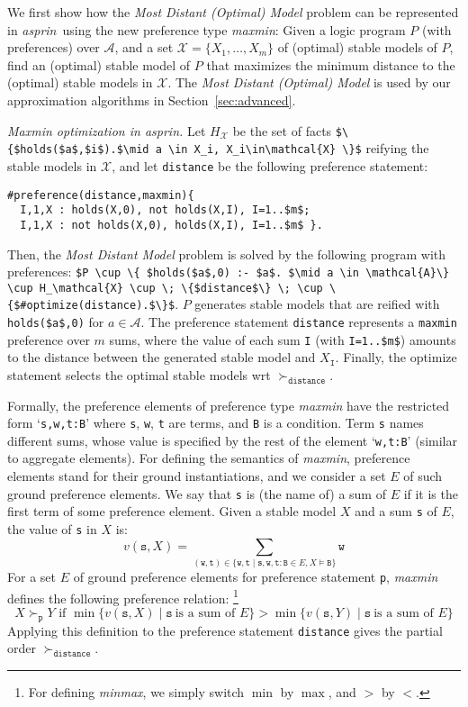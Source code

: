 \documentclass[a4paper,USenglish]{oasics-v2016}
\newcommand{\lm}[1]{\lstinline[mathescape=true]!#1!}
\newcommand{\sysfont}{\textit}
\newcommand{\asprin}{\sysfont{asprin}}
\begin{document}
We first show how the \emph{Most Distant (Optimal) Model} problem can be represented in \asprin\ 
using the new preference type \textit{maxmin}: %
Given a logic program $P$ (with preferences) over $\mathcal{A}$, 
and a set $\mathcal{X}=\{ X_1, \ldots, X_m \}$ of (optimal) stable models of $P$, 
find an (optimal) stable model of $P$ that 
maximizes the minimum distance to the (optimal) stable models in $\mathcal{X}$.
%
The \emph{Most Distant (Optimal) Model} is used by our approximation algorithms in Section~\ref{sec:advanced}.

\emph{Maxmin optimization in \asprin.}
%
Let $H_\mathcal{X}$ be the set of facts \lstinline[mathescape=true]!$\{$holds($a$,$i$).$\mid a \in X_i, X_i\in\mathcal{X} \}$!
reifying the stable models in $\mathcal{X}$,  
and let \lstinline!distance! be the following preference statement:
%
\begin{lstlisting}[mathescape=true]
#preference(distance,maxmin){
  I,1,X : holds(X,0), not holds(X,I), I=1..$m$;
  I,1,X : not holds(X,0), holds(X,I), I=1..$m$ }.
\end{lstlisting}
%
Then, the \emph{Most Distant Model} problem is solved by the following program with preferences:
\lstinline[mathescape=true]!$P \cup \{ $holds($a$,0) :- $a$. $\mid a \in \mathcal{A}\} \cup H_\mathcal{X} \cup \; \{$distance$\} \; \cup \{$#optimize(distance).$\}$!.
%
$P$ generates stable models that are reified with \lm{holds($a$,0)} for $a \in \mathcal{A}$. 
%
The preference statement \lstinline!distance! represents a \lstinline!maxmin! preference over $m$ sums, 
where the value of each sum \lstinline!I! (with \lstinline[mathescape=true]!I=1..$m$!)
amounts to the distance between the generated stable model and $X_\mathtt{I}$.
%
Finally, the optimize statement selects the optimal stable models wrt $\succ_\mathtt{distance}$.

Formally, the preference elements of preference type \textit{maxmin} have the restricted form
`\lm{s,w,t:B}'
%
where \lm{s}, \lm{w}, \lm{t} are terms, and \lm{B} is a condition.
%
Term \lm{s} names different sums,
whose value is specified by the rest of the element `\lm{w,t:B}'
(similar to aggregate elements).
%
For defining the semantics of \textit{maxmin}, 
preference elements stand for their ground instantiations, 
and we consider a set $E$ of such ground preference elements.
%
We say that \lm{s} is (the name of) a sum of $E$ if it is the first term of some preference element.
Given a stable model $X$ and a sum \lm{s} of $E$, the value of \lm{s} in $X$ is:
\[\textstyle
v(\mathtt{s},X)=\sum_{(\mathtt{w},\mathtt{t})\in\{\mathtt{w},\mathtt{t}\mid \mathtt{s,w,t:B}\in E, X\models \mathtt{B}\}}\mathtt{w}
\]
For a set $E$ of ground preference elements for preference statement \lm{p}, 
\textit{maxmin} defines the following preference relation:%
\footnote{For defining \textit{minmax}, we simply switch $\min$ by $\max$, and $>$ by $<$.}
\[
X \succ_\mathtt{p} Y \text{ if } \min \{ v(\mathtt{s},X) \mid \mathtt{s} \ \text{is a sum of } E \} > \min \{ v(\mathtt{s},Y) \mid \mathtt{s} \ \text{is a sum of } E \} 
\]
Applying this definition to the preference statement \lm{distance} gives the partial order $\succ_\mathtt{distance}$.
\end{document}
